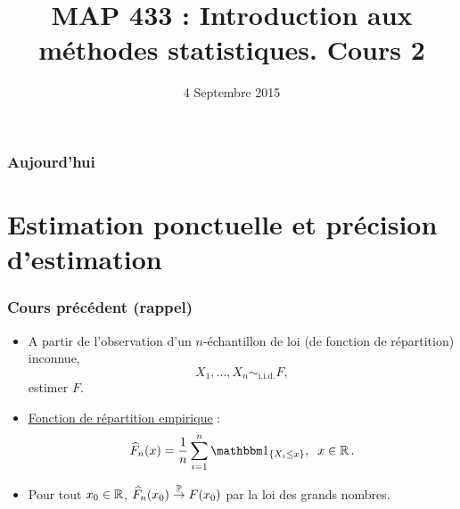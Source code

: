 
\title{MAP 433 : Introduction aux méthodes statistiques. Cours 2}
\date{4 Septembre 2015}

\maketitle



\begin{frame}
\frametitle{Aujourd'hui}
\tableofcontents
\section{Estimation ponctuelle et précision d'estimation}

\end{frame}

\begin{frame}
\frametitle{Cours précédent (rappel)}
\begin{itemize}
\item A partir de l'observation d'un $n$-échantillon de loi (de fonction de répartition) inconnue,
$$X_1,\ldots, X_n \sim_{\text{i.i.d.}}F,$$
\alert{estimer} $F$.
\item \underline{Fonction de répartition empirique} :
$$\widehat F_n(x) = \frac{1}{n}\sum_{i = 1}^n \indi{X_i \leq x},\;\;x \in \R.$$
\item Pour tout $x_0 \in \operatorname{{\mathbb R}}$, $\widehat F_n(x_0) \stackrel{\operatorname{{\mathbb P}}}{\rightarrow}F(x_0)$ par la loi des grands nombres.
\end{itemize}
\end{frame}


